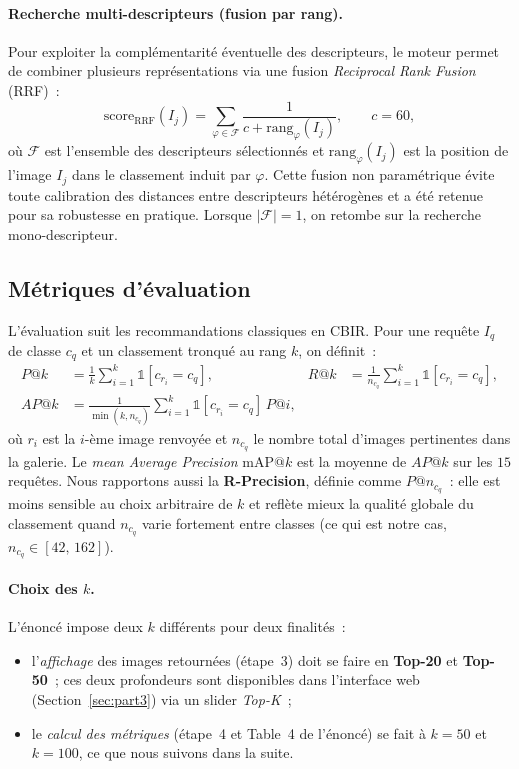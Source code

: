 \documentclass[a4paper,11pt]{article}
\begin{document}
\paragraph{Recherche multi-descripteurs (fusion par rang).}
Pour exploiter la complémentarité éventuelle des descripteurs, le moteur
permet de combiner plusieurs représentations via une fusion
\textit{Reciprocal Rank Fusion} (RRF)~:
\begin{equation}
    \mathrm{score}_{\text{RRF}}(I_j) = \sum_{\varphi \in \mathcal{F}} \frac{1}{c + \mathrm{rang}_\varphi(I_j)},
    \qquad c = 60,
    \label{eq:rrf}
\end{equation}
où $\mathcal{F}$ est l'ensemble des descripteurs sélectionnés et
$\mathrm{rang}_\varphi(I_j)$ est la position de l'image $I_j$ dans le
classement induit par $\varphi$. Cette fusion non paramétrique évite
toute calibration des distances entre descripteurs hétérogènes et a été
retenue pour sa robustesse en pratique. Lorsque $|\mathcal{F}|=1$, on
retombe sur la recherche mono-descripteur.

\subsection{Métriques d'évaluation}
\label{subsec:eval_metrics}

L'évaluation suit les recommandations classiques en CBIR. Pour une
requête $I_q$ de classe $c_q$ et un classement tronqué au rang $k$, on
définit~:
\begin{align}
    P@k &= \frac{1}{k}\sum_{i=1}^{k} \mathbb{1}[c_{r_i}=c_q], &
    R@k &= \frac{1}{n_{c_q}}\sum_{i=1}^{k} \mathbb{1}[c_{r_i}=c_q], \\
    AP@k &= \frac{1}{\min(k, n_{c_q})}\sum_{i=1}^{k} \mathbb{1}[c_{r_i}=c_q]\,P@i,
\end{align}
où $r_i$ est la $i$-ème image renvoyée et $n_{c_q}$ le nombre total
d'images pertinentes dans la galerie. Le \emph{mean Average Precision}
$\text{mAP}@k$ est la moyenne de $AP@k$ sur les $15$ requêtes. Nous
rapportons aussi la \textbf{R-Precision}, définie comme $P@n_{c_q}$~:
elle est moins sensible au choix arbitraire de $k$ et reflète mieux la
qualité globale du classement quand $n_{c_q}$ varie fortement entre
classes (ce qui est notre cas, $n_{c_q} \in [42,\,162]$).

\paragraph{Choix des $k$.}
L'énoncé impose deux $k$ différents pour deux finalités~:
\begin{itemize}
    \item l'\emph{affichage} des images retournées (étape~3) doit se
    faire en \textbf{Top-20} et \textbf{Top-50}~; ces deux profondeurs
    sont disponibles dans l'interface web (Section~\ref{sec:part3}) via
    un slider \emph{Top-K}~;
    \item le \emph{calcul des métriques} (étape~4 et Table~4 de
    l'énoncé) se fait à $k=50$ et $k=100$, ce que nous suivons dans la
    suite.
\end{itemize}
\end{document}
